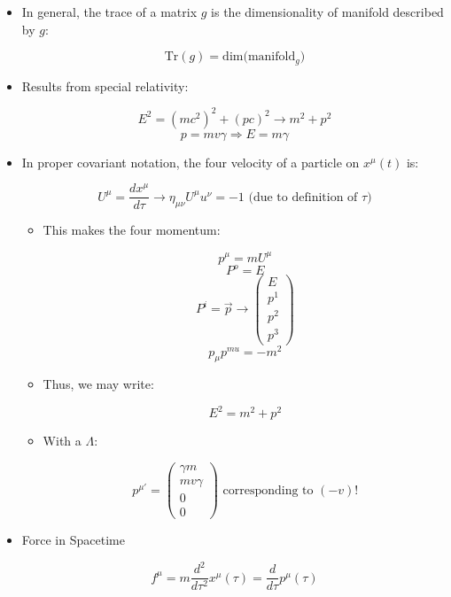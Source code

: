 \begin{itemize}

  \item In general, the trace of a matrix $g$ is the dimensionality of manifold described by $g$:

    $$\text{Tr}(g)=\text{dim(manifold$_g$)}$$

  \item Results from special relativity:

    $$E^2=(mc^2)^2+(pc)^2\to m^2+p^2$$
    $$p=mv\gamma\Rightarrow E=m\gamma$$

  \item In proper covariant notation, the four velocity of a particle on $x^{\mu}(t)$ is:

    $$U^{\mu}=\frac{dx^{\mu}}{d\tau}\to \eta_{\mu\nu}U^{\mu}u^{\nu}=-1\text{ (due to definition of $\tau$)}$$

    \begin{itemize}

      \item This makes the four momentum:

        $$p^{\mu}=mU^{\mu}$$
        $$P^o=E$$
        $$P^i=\vec{p}\to\left(\begin{array}{c}E\\p^1\\p^2\\p^3\end{array}\right)$$
        $$p_{\mu}p^{mu}=-m^2$$

      \item Thus, we may write:

        $$E^2=m^2+p^2$$

      \item With a $\Lambda$:

        $$p^{\mu'}=\left( \begin{array}{c} \gamma m\\mv\gamma\\0\\0\end{array} \right)\text{ corresponding to $(-v)$!}$$

    \end{itemize}

  \item Force in Spacetime

    $$f^{\mu}=m\frac{d^2}{d\tau^2}x^{\mu}(\tau)=\frac{d}{d\tau}p^{\mu}(\tau)$$

    \begin{itemize}


\end{itemize}
\end{itemize}
